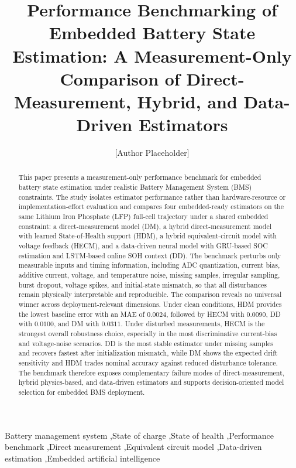 \documentclass[review]{elsarticle}
\date{}
\begin{document}
\linenumbers
\begin{frontmatter}
\title{Performance Benchmarking of Embedded Battery State Estimation: A Measurement-Only Comparison of Direct-Measurement, Hybrid, and Data-Driven Estimators}
\author[1]{[Author Placeholder]}
\begin{abstract}
This paper presents a measurement-only performance benchmark for embedded battery state estimation under realistic Battery Management System (BMS) constraints. The study isolates estimator performance rather than hardware-resource or implementation-effort evaluation and compares four embedded-ready estimators on the same Lithium Iron Phosphate (LFP) full-cell trajectory under a shared embedded constraint: a direct-measurement model (DM), a hybrid direct-measurement model with learned State-of-Health support (HDM), a hybrid equivalent-circuit model with voltage feedback (HECM), and a data-driven neural model with GRU-based SOC estimation and LSTM-based online SOH context (DD). The benchmark perturbs only measurable inputs and timing information, including ADC quantization, current bias, additive current, voltage, and temperature noise, missing samples, irregular sampling, burst dropout, voltage spikes, and initial-state mismatch, so that all disturbances remain physically interpretable and reproducible. The comparison reveals no universal winner across deployment-relevant dimensions. Under clean conditions, HDM provides the lowest baseline error with an MAE of $0.0024$, followed by HECM with $0.0090$, DD with $0.0100$, and DM with $0.0311$. Under disturbed measurements, HECM is the strongest overall robustness choice, especially in the most discriminative current-bias and voltage-noise scenarios. DD is the most stable estimator under missing samples and recovers fastest after initialization mismatch, while DM shows the expected drift sensitivity and HDM trades nominal accuracy against reduced disturbance tolerance. The benchmark therefore exposes complementary failure modes of direct-measurement, hybrid physics-based, and data-driven estimators and supports decision-oriented model selection for embedded BMS deployment.
\end{abstract}
\begin{keyword}
Battery management system \sep State of charge \sep State of health \sep Performance benchmark \sep Direct measurement \sep Equivalent circuit model \sep Data-driven estimation \sep Embedded artificial intelligence
\end{keyword}
\end{frontmatter}
\end{document}
